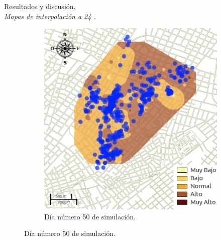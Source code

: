 \begin{frame}[t]{Resultados y discusión.\\\textit{Mapas de interpolación a 24 \textcelsius.}}
\begin{figure}
\begin{subfigure}[b]{0.45\textwidth}
        \includegraphics[width=\textwidth]{./graphics/temp-24-final.png}
        \caption{Día número 50 de simulación.}
    \end{subfigure}
    \end{figure}
\end{frame}

